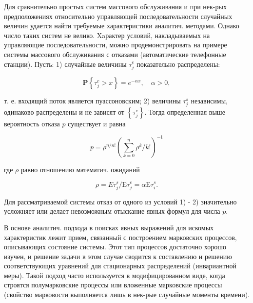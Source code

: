 \documentclass[10pt]{article}
\begin{document}
Для сравнительно простых систем массового обслуживания и при нек-рых предположениях относительно управляющей последовательности случайных величин удается найти требуемые характеристики аналитич. методами. Однако число таких систем не велико. Xaрактер условий, накладываемых на управляющие последовательности, можно продемонстрировать на примере системы массового обслуживания с отказами (автоматические телефонные станции). Пусть: 1) случайные величины $\tau_{j}^{e}$ показательно распределены:



\[

\mathbf{P}\left\{\tau_{j}^{e}>x\right\}=e^{-\alpha x}, \quad \alpha>0,

\]



т. е. входящий поток является пуассоновским; 2) величины $\tau_{j}^{s}$ независимы, одинаково распределены и не зависят от $\left\{\tau_{j}^{e}\right\}$. Тогда определенная выше вероятность отказа $p$ существует и равна



\[

p=\rho^{n / n !}\left(\sum_{k=0}^{n} \rho^{k} / k !\right)^{-1}

\]



где $\rho$ равно отношению математич. ожиданий



\[

\rho=E \tau_{j}^{s} / \mathrm{E} \tau_{j}^{e}=\alpha \mathrm{E} \tau_{i}^{s} .

\]



Для рассматриваемой системы отказ от одного из условий 1) - 2) значительно усложняет или делает невозможным отыскание явных формул для числа $p$.



В основе аналитич. подхода в поисках явных выражений для искомых характеристик лежит прием, связанный с построением марковских процессов, описывающих состояние системы. Этот тип процессов достаточно хорошо изучен, и решение задачи в этом случае сводится к составлению и решению соответствующих уравнений для стационарных распределений (инвариантной меры). Такой подход часто используется в модифицированном виде, когда строятся полумарковские процессы или вложенные марковские процессы (свойство марковости выполняется лишь в нек-рые случайные моменты времени).
\end{document}

